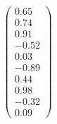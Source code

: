 \documentclass[preview]{standalone}
\begin{document}
\begin{align*}
\begin{pmatrix} 0.65 \\ 0.74 \\ 0.91 \\ -0.52 \\ 0.03 \\ -0.89 \\ 0.44 \\ 0.98 \\ -0.32 \\ 0.09 \end{pmatrix}
\end{align*}
\end{document}
